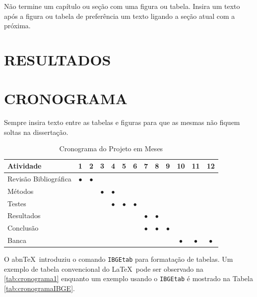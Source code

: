 \documentclass[
    12pt,				       %
    openright,			       %
    oneside,			       %
    a4paper,			       %
    chapter=TITLE,             %
    sumario=tradicional,       %
    english,			        %
    brazil, 				    %
 ]{abntex2}
\begin{document}
Não termine um capítulo ou seção com uma figura ou tabela. Insira um texto após a figura ou tabela de preferência um texto ligando a seção atual com a próxima.

\chapter{\MakeUppercase{Resultados}}\label{sec:resultados}


\chapter{\MakeUppercase{Cronograma}}\label{sec:cronograma}

Sempre insira texto entre as tabelas e figuras para que as mesmas não fiquem soltas na dissertação.

\begin{table}[htbp]
    \centering
    \caption[Cronograma Normal]{Cronograma do Projeto em Meses}
    \label{tab:cronograma1}
    \begin{tabular}{lcccccccccccc} %
        \toprule
        \textbf{Atividade} & \textbf{1} & \textbf{2} & \textbf{3} & \textbf{4} & \textbf{5} & \textbf{6} & \textbf{7} & \textbf{8} & \textbf{9} & \textbf{10} & \textbf{11} & \textbf{12} \\
        \midrule
            Revisão Bibliográfica & $\bullet$ & $\bullet$ & & & & & & & & & & \\
            Métodos & & & $\bullet$ & $\bullet$ & & & & & & & & \\
            Testes & & & & $\bullet$ & $\bullet$ & $\bullet$ & & & & & & \\
            Resultados & & & & & & & $\bullet$ & $\bullet$ & & & & \\
            Conclusão & & & & & & & $\bullet$ & $\bullet$ & $\bullet$ & & & \\
            Banca & & & & & & &&&& $\bullet$ & $\bullet$ & $\bullet$ \\
        \bottomrule
    \end{tabular}
\end{table}

O abn\TeX\ introduziu o comando \texttt{IBGEtab} para formatação de tabelas. Um exemplo de tabela convencional do \LaTeX\ pode ser observado na \autoref{tab:cronograma1} enquanto um exemplo usando o \texttt{IBGEtab} é mostrado na Tabela \autoref{tab:cronogramaIBGE}.
\end{document}
